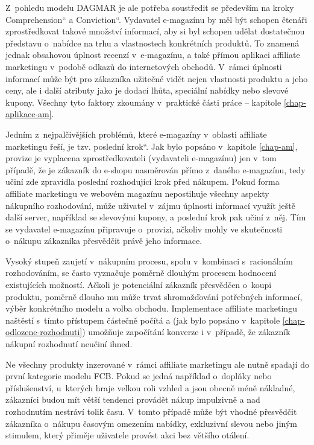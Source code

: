 \documentclass[12pt,twoside,openany]{fithesis}
\begin{document}
Z~pohledu modelu DAGMAR je ale potřeba soustředit se především na kroky 
\glqq Comprehension\textquotedblleft{} a \glqq Conviction\textquotedblleft{}. 
Vydavatel e-magazínu by měl být schopen čtenáři zprostředkovat takové 
množství informací, aby si byl schopen udělat dostatečnou představu 
o~nabídce na trhu a vlastnostech konkrétních produktů. To znamená jednak 
obsahovou úplnost recenzí v~e-magazínu, a také přímou aplikaci affiliate 
marketingu v~podobě odkazů do internetových obchodů. V~rámci úplnosti 
informací může být pro zákazníka užitečné vidět nejen vlastnosti 
produktu a jeho ceny, ale i další atributy jako je dodací lhůta, 
speciální nabídky nebo slevové kupony. Všechny tyto faktory zkoumány 
v~praktické části práce -- kapitole 
\hyperlink{chap-aplikace-am}{{\ref{chap-aplikace-am}}}.

Jedním z~nejpalčivějších problémů, které e-magazíny v~oblasti 
affiliate marketingu řeší, je tzv. \glqq poslední krok\textquotedblleft{}. 
Jak bylo popsáno v~kapitole \hyperlink{chap-am}{{\ref{chap-am}}}, provize je 
vyplacena zprostředkovateli (vydavateli e-magazínu) jen v~tom případě, že 
je zákazník do e-shopu nasměrován přímo z~daného e-magazínu, tedy 
učiní zde zpravidla poslední rozhodující krok před nákupem. Pokud forma 
affiliate marketingu ve webovém magazínu nepostihuje všechny aspekty 
nákupního rozhodování, může uživatel v~zájmu úplnosti informací 
využít ještě další server, například se slevovými kupony, a poslední 
krok pak učiní z~něj. Tím se vydavatel e-magazínu připravuje o~provizi, 
ačkoliv mohly ve skutečnosti o~nákupu zákazníka přesvědčit právě jeho 
informace.

Vysoký stupeň zaujetí v~nákupním procesu, spolu v~kombinaci 
s~racionálním rozhodováním, se často vyznačuje poměrně dlouhým 
procesem hodnocení existujících možností. Ačkoli je potenciální 
zákazník přesvědčen o~koupi produktu, poměrně dlouho mu může trvat 
shromažďování potřebných informací, výběr konkrétního modelu a volba 
obchodu. Implementace affiliate marketingu naštěstí s~tímto přístupem 
částečně počítá a (jak bylo popsáno v~kapitole 
\hyperlink{chap-odlozene-rozhodnuti}{{\ref{chap-odlozene-rozhodnuti}}}) 
umožňuje započítání konverze i v~případě, že zákazník nákupní 
rozhodnutí neučiní ihned.

Ne všechny produkty inzerované v~rámci affiliate marketingu ale nutně 
spadají do první kategorie modelu FCB. Pokud se jedná například o~doplňky 
nebo příslušenství, u~kterých hraje velkou roli vzhled a jsou obecně 
méně nákladné, zákazníci budou mít větší tendenci provádět nákup 
impulzivně a nad rozhodnutím nestráví tolik času. V~tomto případě 
může být vhodné přesvědčit zákazníka o~nákupu časovým omezením 
nabídky, exkluzivní slevou nebo jiným stimulem, který přiměje uživatele 
provést akci bez většího otálení.
\end{document}
